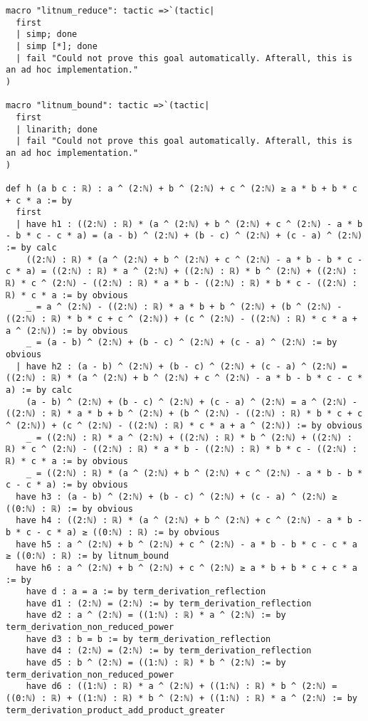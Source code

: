 \documentclass{article}
\begin{document}
\begin{tcolorbox}[colback=white!10, width=\linewidth]
\begin{lstlisting}[language=Lean4]
macro "litnum_reduce": tactic =>`(tactic|
  first
  | simp; done
  | simp [*]; done
  | fail "Could not prove this goal automatically. Afterall, this is an ad hoc implementation."
)

macro "litnum_bound": tactic =>`(tactic|
  first
  | linarith; done
  | fail "Could not prove this goal automatically. Afterall, this is an ad hoc implementation."
)

def h (a b c : ℝ) : a ^ (2:ℕ) + b ^ (2:ℕ) + c ^ (2:ℕ) ≥ a * b + b * c + c * a := by
  first
  | have h1 : ((2:ℕ) : ℝ) * (a ^ (2:ℕ) + b ^ (2:ℕ) + c ^ (2:ℕ) - a * b - b * c - c * a) = (a - b) ^ (2:ℕ) + (b - c) ^ (2:ℕ) + (c - a) ^ (2:ℕ) := by calc
    ((2:ℕ) : ℝ) * (a ^ (2:ℕ) + b ^ (2:ℕ) + c ^ (2:ℕ) - a * b - b * c - c * a) = ((2:ℕ) : ℝ) * a ^ (2:ℕ) + ((2:ℕ) : ℝ) * b ^ (2:ℕ) + ((2:ℕ) : ℝ) * c ^ (2:ℕ) - ((2:ℕ) : ℝ) * a * b - ((2:ℕ) : ℝ) * b * c - ((2:ℕ) : ℝ) * c * a := by obvious
    _ = a ^ (2:ℕ) - ((2:ℕ) : ℝ) * a * b + b ^ (2:ℕ) + (b ^ (2:ℕ) - ((2:ℕ) : ℝ) * b * c + c ^ (2:ℕ)) + (c ^ (2:ℕ) - ((2:ℕ) : ℝ) * c * a + a ^ (2:ℕ)) := by obvious
    _ = (a - b) ^ (2:ℕ) + (b - c) ^ (2:ℕ) + (c - a) ^ (2:ℕ) := by obvious
  | have h2 : (a - b) ^ (2:ℕ) + (b - c) ^ (2:ℕ) + (c - a) ^ (2:ℕ) = ((2:ℕ) : ℝ) * (a ^ (2:ℕ) + b ^ (2:ℕ) + c ^ (2:ℕ) - a * b - b * c - c * a) := by calc
    (a - b) ^ (2:ℕ) + (b - c) ^ (2:ℕ) + (c - a) ^ (2:ℕ) = a ^ (2:ℕ) - ((2:ℕ) : ℝ) * a * b + b ^ (2:ℕ) + (b ^ (2:ℕ) - ((2:ℕ) : ℝ) * b * c + c ^ (2:ℕ)) + (c ^ (2:ℕ) - ((2:ℕ) : ℝ) * c * a + a ^ (2:ℕ)) := by obvious
    _ = ((2:ℕ) : ℝ) * a ^ (2:ℕ) + ((2:ℕ) : ℝ) * b ^ (2:ℕ) + ((2:ℕ) : ℝ) * c ^ (2:ℕ) - ((2:ℕ) : ℝ) * a * b - ((2:ℕ) : ℝ) * b * c - ((2:ℕ) : ℝ) * c * a := by obvious
    _ = ((2:ℕ) : ℝ) * (a ^ (2:ℕ) + b ^ (2:ℕ) + c ^ (2:ℕ) - a * b - b * c - c * a) := by obvious
  have h3 : (a - b) ^ (2:ℕ) + (b - c) ^ (2:ℕ) + (c - a) ^ (2:ℕ) ≥ ((0:ℕ) : ℝ) := by obvious
  have h4 : ((2:ℕ) : ℝ) * (a ^ (2:ℕ) + b ^ (2:ℕ) + c ^ (2:ℕ) - a * b - b * c - c * a) ≥ ((0:ℕ) : ℝ) := by obvious
  have h5 : a ^ (2:ℕ) + b ^ (2:ℕ) + c ^ (2:ℕ) - a * b - b * c - c * a ≥ ((0:ℕ) : ℝ) := by litnum_bound
  have h6 : a ^ (2:ℕ) + b ^ (2:ℕ) + c ^ (2:ℕ) ≥ a * b + b * c + c * a := by
    have d : a = a := by term_derivation_reflection
    have d1 : (2:ℕ) = (2:ℕ) := by term_derivation_reflection
    have d2 : a ^ (2:ℕ) = ((1:ℕ) : ℝ) * a ^ (2:ℕ) := by term_derivation_non_reduced_power
    have d3 : b = b := by term_derivation_reflection
    have d4 : (2:ℕ) = (2:ℕ) := by term_derivation_reflection
    have d5 : b ^ (2:ℕ) = ((1:ℕ) : ℝ) * b ^ (2:ℕ) := by term_derivation_non_reduced_power
    have d6 : ((1:ℕ) : ℝ) * a ^ (2:ℕ) + ((1:ℕ) : ℝ) * b ^ (2:ℕ) = ((0:ℕ) : ℝ) + ((1:ℕ) : ℝ) * b ^ (2:ℕ) + ((1:ℕ) : ℝ) * a ^ (2:ℕ) := by term_derivation_product_add_product_greater

\end{lstlisting}
\end{tcolorbox}
\end{document}
